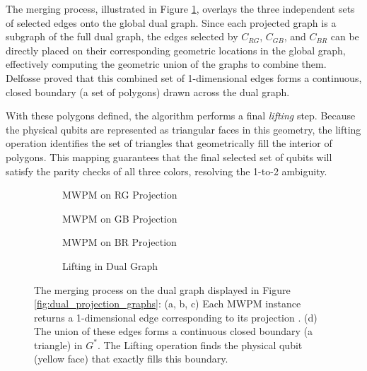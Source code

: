 The merging process, illustrated in Figure \ref{fig:dual_merge_step}, overlays the three independent sets of selected edges onto the global dual graph. Since each projected graph is a subgraph of the full dual graph, the edges selected by $C_{RG}$, $C_{GB}$, and $C_{BR}$ can be directly placed on their corresponding geometric locations in the global graph, effectively computing the geometric union of the graphs to combine them. Delfosse proved that this combined set of 1-dimensional edges forms a continuous, closed boundary (a set of polygons) drawn across the dual graph.

With these polygons defined, the algorithm performs a final \textit{lifting} step. Because the physical qubits are represented as triangular faces in this geometry, the lifting operation identifies the set of triangles that geometrically fill the interior of polygons. This mapping guarantees that the final selected set of qubits will satisfy the parity checks of all three colors, resolving the 1-to-2 ambiguity.

\begin{figure}[H]
    \centering
    \begin{subfigure}[b]{0.45\textwidth}
        \centering
        
        \caption{MWPM on RG Projection}
    \end{subfigure}
    \hfill
    \begin{subfigure}[b]{0.45\textwidth}
        \centering
        
        \caption{MWPM on GB Projection}
    \end{subfigure}

    \vspace{0.5cm}

    \begin{subfigure}[b]{0.45\textwidth}
        \centering
        
        \caption{MWPM on BR Projection}
    \end{subfigure}
    \hfill
    \begin{subfigure}[b]{0.45\textwidth}
        \centering
        
        \caption{Lifting in Dual Graph}
    \end{subfigure}
    \caption[Projection decoding on the dual graph]{The merging process on the dual graph displayed in Figure \ref{fig:dual_projection_graphs}: (a, b, c) Each MWPM instance returns a 1-dimensional edge corresponding to its projection . (d) The union of these edges forms a continuous closed boundary (a triangle) in $G^*$. The Lifting operation finds the physical qubit (yellow face) that exactly fills this boundary.}
    \label{fig:dual_merge_step}
\end{figure}

